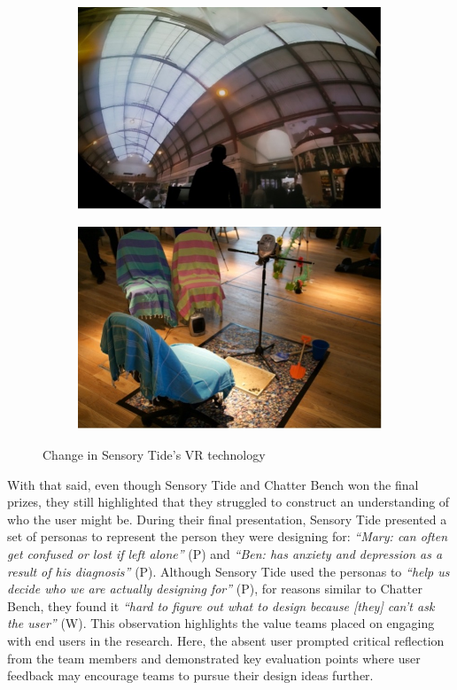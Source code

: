 \begin{figure}
\centering
\begin{subfigure}{.5\textwidth}
  \centering
  \includegraphics[width=.8\linewidth]{Images/DemVR/Findings/DomeProjection.jpg}
\end{subfigure}%
\begin{subfigure}{.5\textwidth}
  \centering
  \includegraphics[width=.8\linewidth]{Images/DemVR/Findings/SensoryTideDIY.jpg}
  \label{fig:senosryTideDIY}
\end{subfigure}
\caption{Change in Sensory Tide's VR technology}
\label{fig:SensoryTideDesignProcess}
\end{figure}

With that said, even though Sensory Tide and Chatter Bench won the final prizes, they still highlighted that they struggled to construct an understanding of who the user might be. During their final presentation, Sensory Tide presented a set of personas to represent the person they were designing for: \textit{``Mary: can often get confused or lost if left alone''} (P) and \textit{``Ben: has anxiety and depression as a result of his diagnosis''} (P). Although Sensory Tide used the personas to \textit{``help us decide who we are actually designing for''} (P), for reasons similar to Chatter Bench, they found it \textit{``hard to figure out what to design because [they] can’t ask the user''} (W). This observation highlights the value teams placed on engaging with end users in the research. Here, the absent user prompted critical reflection from the team members and demonstrated key evaluation points where user feedback may encourage teams to pursue their design ideas further. 

